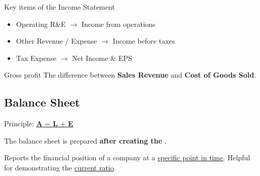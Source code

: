 \begin{knBox}
    {Key items of the Income Statement}
    \begin{itemize}
        \item Operating R\&E $\rightarrow$ Income from operations
        \item Other Revenue / Expense $\rightarrow$ Income before taxes
        \item Tax Expense $\rightarrow$ Net Income \& EPS
    \end{itemize}
\end{knBox}

\begin{knBox}
    {Gross profit}
    The difference between \textbf{Sales Revenue} and \textbf{Cost of Goods Sold}.
\end{knBox}

\subsection{Balance Sheet}
\label{sec:balance_sheet}

Principle: \hyperref[thm:relations]{\textbf{A} = \textbf{L} + \textbf{E}}

The balance sheet is prepared \textbf{after creating the }.

Reports the financial position of a company at a \underline{specific point in time}. Helpful for demonstrating the \hyperref[def:current_ratio]{current ratio}.

